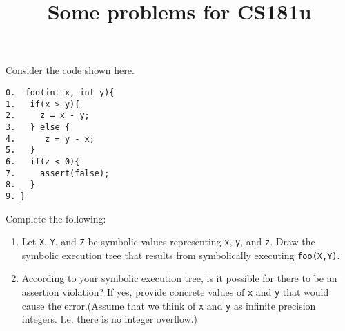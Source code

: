 \documentclass[12pt]{article}
\title{Some problems for CS181u}
\date{}
\newenvironment{problem}[2][Problem]{\begin{trivlist}
\item[\hskip \labelsep {\bfseries #1}\hskip \labelsep {\bfseries #2.}]}{\end{trivlist}}
\begin{document}
\maketitle



\begin{problem}{Symbolic Execution} Consider the code shown here.

\begin{verbatim}
0.  foo(int x, int y){
1.   if(x > y){
2.     z = x - y;
3.   } else {
4.	    z = y - x;
5.   }
6.   if(z < 0){
7.     assert(false);
8.   }
9. }
\end{verbatim}

Complete the following:


\begin{enumerate}[label=\roman*.]










\item Let \texttt{X}, \texttt{Y}, and \texttt{Z} be symbolic values representing \texttt{x}, \texttt{y}, and \texttt{z}. Draw the symbolic execution tree that results from symbolically executing \texttt{foo(X,Y)}.

\vspace{6.0cm}


\item According to your symbolic execution tree, is it possible for there to be an assertion violation? If yes, provide concrete values of \texttt{x} and \texttt{y} that would cause the error.(Assume that we think of \texttt{x} and \texttt{y} as infinite precision integers. I.e. there is no integer overflow.)

\end{enumerate}


\end{problem}
\end{document}
